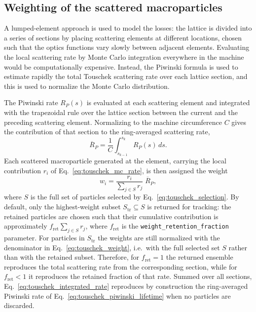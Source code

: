 \subsection{Weighting of the scattered macroparticles}
\label{section:touschek_weights}

A lumped-element approach is used to model the losses: the lattice is divided
into a series of sections by placing scattering elements at different locations,
chosen such that the optics functions vary slowly between adjacent elements.
Evaluating the local scattering rate by Monte Carlo integration everywhere in the
machine would be computationally expensive. Instead, the Piwinski formula is used
to estimate rapidly the total Touschek scattering rate over each lattice section,
and this is used to normalize the Monte Carlo distribution.

The Piwinski rate $R_P(s)$ is evaluated at each scattering element and integrated
with the trapezoidal rule over the lattice section between the current and the
preceding scattering element. Normalizing to the machine circumference $C$ gives
the contribution of that section to the ring-averaged scattering rate,
\begin{equation}
    \overline{R}_P = \frac{1}{C}
    \int_{s_{k-1}}^{s_k} R_P(s)\, ds .
    \label{eq:touschek_integrated_rate}
\end{equation}
Each scattered macroparticle generated at the element, carrying the local
contribution $r_i$ of Eq.~\eqref{eq:touschek_mc_rate}, is then assigned the
weight
\begin{equation}
    w_i = \frac{r_i}{\sum_{j\in S} r_j} \; \overline{R}_P ,
    \label{eq:touschek_weight}
\end{equation}
where $S$ is the full set of particles selected by
Eq.~\eqref{eq:touschek_selection}. By default, only the highest-weight subset
$S_{\mathrm{tr}}\subseteq S$ is returned for tracking: the retained particles are
chosen such that their cumulative contribution is approximately
$f_{\mathrm{ret}}\sum_{j\in S} r_j$, where $f_{\mathrm{ret}}$ is the
\texttt{weight\_retention\_fraction} parameter. For particles in $S_{\mathrm{tr}}$ the
weights are still normalized with the denominator in
Eq.~\eqref{eq:touschek_weight}, i.e.\ with the full selected set $S$ rather than
with the retained subset. Therefore, for $f_{\mathrm{ret}}=1$ the returned
ensemble reproduces the total scattering rate from the corresponding section,
while for $f_{\mathrm{ret}}<1$ it reproduces the retained fraction of that rate.
Summed over all sections, Eq.~\eqref{eq:touschek_integrated_rate} reproduces by
construction the ring-averaged Piwinski rate of
Eq.~\eqref{eq:touschek_piwinski_lifetime} when no particles are discarded.

